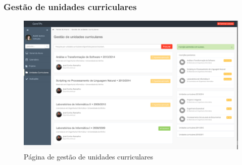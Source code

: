 \subsubsection{Gestão de unidades curriculares}

\begin{figure}[H]
  \centering
  \includegraphics[width=1\textwidth,center]{images/implementacao/alunos/subjects}
  \caption{Página de gestão de unidades curriculares}
  \label{fig:student_subjects}
\end{figure}
